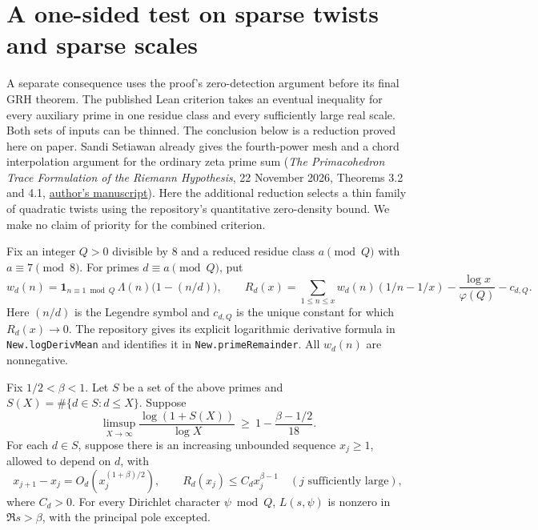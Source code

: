 \section{A one-sided test on sparse twists and sparse scales}
\label{sec:sparse}
A separate consequence uses the proof's zero-detection argument before its
final GRH theorem. The published Lean criterion takes an eventual inequality
for every auxiliary prime in one residue class and every sufficiently large
real scale. Both sets of inputs can be thinned. The conclusion below is a
reduction proved here on paper. Sandi Setiawan already gives the fourth-power
mesh and a chord interpolation argument for the ordinary zeta prime sum
(\emph{The Primacohedron Trace Formulation of the Riemann Hypothesis},
22 November 2026, Theorems 3.2 and 4.1,
\href{https://www.academia.edu/181628231}{author's manuscript}).
Here the additional reduction selects a thin family of quadratic twists
using the repository's quantitative zero-density bound. We make no claim
of priority for the combined criterion.

Fix an integer $Q>0$ divisible by $8$ and a reduced residue class
$a\pmod Q$ with $a\equiv7\pmod8$. For primes $d\equiv a\pmod Q$, put
\[
 w_d(n)=\mathbf1_{n\equiv1\bmod Q}\,\Lambda(n)
       \bigl(1-(n/d)\bigr),\qquad
 R_d(x)=\sum_{1\le n\le x} w_d(n)(1/n-1/x)
       -\frac{\log x}{\varphi(Q)}-c_{d,Q}.
\]
Here $(n/d)$ is the Legendre symbol and $c_{d,Q}$ is the unique constant
for which $R_d(x)\to0$. The repository gives its explicit logarithmic
derivative formula in \texttt{New.logDerivMean} and identifies it in
\texttt{New.primeRemainder}. All $w_d(n)$ are nonnegative.

\begin{theorem}
Fix $1/2<\beta<1$. Let $S$ be a set of the above primes and
$S(X)=\#\{d\in S:d\le X\}$. Suppose
\[
 \limsup_{X\to\infty}\frac{\log(1+S(X))}{\log X}
 \ \ge\ 1-\frac{\beta-1/2}{18}.
 \tag{S}
\]
For each $d\in S$, suppose there is an increasing unbounded sequence
$x_j\ge1$, allowed to depend on $d$, with
\[
 x_{j+1}-x_j=O_d(x_j^{(1+\beta)/2}),\qquad
 R_d(x_j)\le C_d x_j^{\beta-1}\quad(j\text{ sufficiently large}),
 \tag{E}
\]
where $C_d>0$. For every Dirichlet character $\psi\bmod Q$,
$L(s,\psi)$ is nonzero in $\Re s>\beta$, with the principal pole excepted.
\end{theorem}

